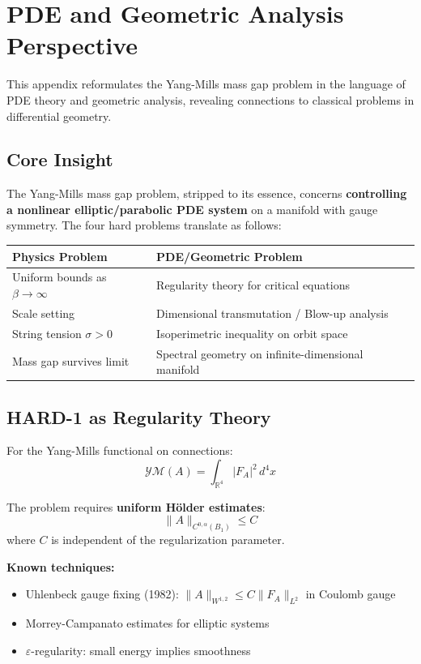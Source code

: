 \section{PDE and Geometric Analysis Perspective}
\label{app:pde-perspective}

This appendix reformulates the Yang-Mills mass gap problem in the language of 
PDE theory and geometric analysis, revealing connections to classical problems 
in differential geometry.

\subsection{Core Insight}

The Yang-Mills mass gap problem, stripped to its essence, concerns 
\textbf{controlling a nonlinear elliptic/parabolic PDE system} on a manifold 
with gauge symmetry. The four hard problems translate as follows:

\begin{center}
\begin{tabular}{|l|l|}
\hline
\textbf{Physics Problem} & \textbf{PDE/Geometric Problem} \\
\hline
Uniform bounds as $\beta \to \infty$ & Regularity theory for critical equations \\
Scale setting & Dimensional transmutation / Blow-up analysis \\
String tension $\sigma > 0$ & Isoperimetric inequality on orbit space \\
Mass gap survives limit & Spectral geometry on infinite-dimensional manifold \\
\hline
\end{tabular}
\end{center}

\subsection{HARD-1 as Regularity Theory}

For the Yang-Mills functional on connections:
\[
\mathcal{YM}(A) = \int_{\mathbb{R}^4} |F_A|^2 \, d^4x
\]

The problem requires \textbf{uniform H\"older estimates}:
\[
\|A\|_{C^{0,\alpha}(B_1)} \leq C
\]
where $C$ is independent of the regularization parameter.

\textbf{Known techniques:}
\begin{itemize}
\item Uhlenbeck gauge fixing (1982): $\|A\|_{W^{1,2}} \leq C\|F_A\|_{L^2}$ in Coulomb gauge
\item Morrey-Campanato estimates for elliptic systems
\item $\varepsilon$-regularity: small energy implies smoothness
\end{itemize}

